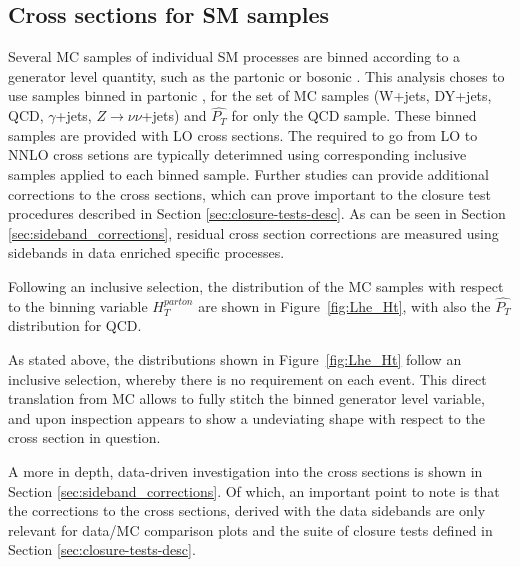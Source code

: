 \subsection{Cross sections for SM samples}
Several MC samples of individual SM processes are binned according to a generator level quantity, such as the partonic \HT or bosonic \PT.
This analysis choses to use samples binned in partonic \HT, for the set of MC samples (W+jets, DY+jets, QCD, $\gamma$+jets, $Z\rightarrow \nu\nu$+jets) and $\hat{P_{T}}$
for only the QCD sample.
These binned samples are provided with LO cross sections. The \kfactors required to go from LO to NNLO cross setions are typically deterimned using corresponding
inclusive samples applied to each \HT binned sample.
Further studies can provide additional corrections to the cross sections, which can prove important to the closure test procedures described in
Section \ref{sec:closure-tests-desc}. As can be seen in Section \ref{sec:sideband_corrections}, residual cross section
corrections are measured using sidebands in data enriched specific processes.

Following an inclusive selection, the distribution of the MC samples with respect to the binning variable $H_{T}^{parton}$ are shown in Figure~\ref{fig:Lhe_Ht}, with
also the $\hat{P_{T}}$ distribution for QCD.

As stated above, the distributions shown in Figure~\ref{fig:Lhe_Ht} follow an inclusive selection, whereby there is no requirement on each event. This direct translation
from MC allows to fully stitch the binned generator level variable, and upon inspection appears to show a undeviating shape with respect to the cross section in question.

A more in depth, data-driven investigation into the cross sections is shown in Section \ref{sec:sideband_corrections}. Of which, an important point to note is that
the corrections to the cross sections, derived with the data sidebands are only relevant for data/MC comparison plots and the suite of closure tests defined in Section \ref{sec:closure-tests-desc}.

